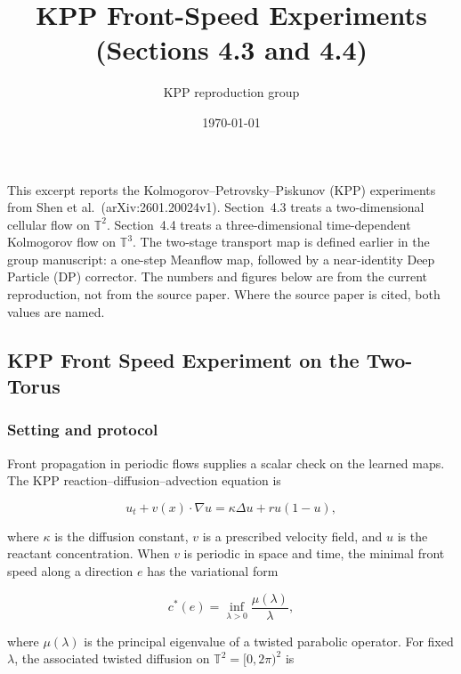 \documentclass[11pt]{article}
\title{KPP Front-Speed Experiments (Sections 4.3 and 4.4)}
\author{KPP reproduction group}
\date{\today}
\begin{document}
\maketitle

\setcounter{section}{4}
\setcounter{subsection}{2}
\setcounter{figure}{4}

This excerpt reports the Kolmogorov--Petrovsky--Piskunov (KPP) experiments
from Shen et al.\ (arXiv:2601.20024v1). Section~4.3 treats a
two-dimensional cellular flow on \(\mathbb{T}^2\). Section~4.4 treats a
three-dimensional time-dependent Kolmogorov flow on \(\mathbb{T}^3\).
The two-stage transport map is defined earlier in the group manuscript:
a one-step Meanflow map, followed by a near-identity Deep Particle (DP)
corrector. The numbers and figures below are from the current
reproduction, not from the source paper. Where the source paper is cited,
both values are named.

\subsection{KPP Front Speed Experiment on the Two-Torus}

\subsubsection{Setting and protocol}

Front propagation in periodic flows supplies a scalar check on the learned
maps. The KPP reaction--diffusion--advection equation is

\begin{equation}
u_t+v(x)\cdot\nabla u=\kappa\Delta u+r u(1-u),
\end{equation}

where \(\kappa\) is the diffusion constant, \(v\) is a prescribed velocity
field, and \(u\) is the reactant concentration. When \(v\) is periodic in
space and time, the minimal front speed along a direction \(e\) has the
variational form

\begin{equation}
c^*(e)=\inf_{\lambda>0}\frac{\mu(\lambda)}{\lambda},
\end{equation}

where \(\mu(\lambda)\) is the principal eigenvalue of a twisted parabolic
operator. For fixed \(\lambda\), the associated twisted diffusion on
\(\mathbb{T}^2=[0,2\pi)^2\) is
\end{document}
